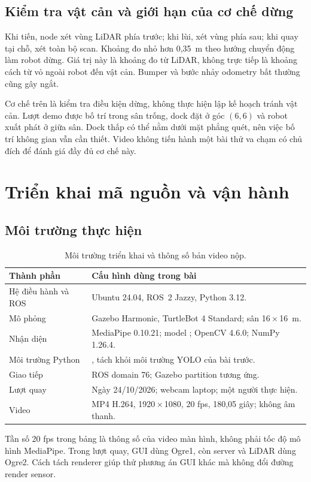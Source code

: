 \documentclass[12pt,a4paper]{article}
\newcommand{\smalltable}{\small\setlength{\tabcolsep}{4pt}\renewcommand{\arraystretch}{1.12}}
\begin{document}
\subsection{Kiểm tra vật cản và giới hạn của cơ chế dừng}
Khi tiến, node xét vùng LiDAR phía trước; khi lùi, xét vùng phía sau; khi quay tại chỗ, xét toàn bộ scan. Khoảng đo nhỏ hơn 0,35~m theo hướng chuyển động làm robot dừng. Giá trị này là khoảng đo từ LiDAR, không trực tiếp là khoảng cách từ vỏ ngoài robot đến vật cản. Bumper và bước nhảy odometry bất thường cũng gây ngắt.

Cơ chế trên là kiểm tra điều kiện dừng, không thực hiện lập kế hoạch tránh vật cản. Lượt demo được bố trí trong sân trống, dock đặt ở góc $(6,6)$ và robot xuất phát ở giữa sân. Dock thấp có thể nằm dưới mặt phẳng quét, nên việc bố trí không gian vẫn cần thiết. Video không tiến hành một bài thử va chạm có chủ đích để đánh giá đầy đủ cơ chế này.

\section{Triển khai mã nguồn và vận hành}
\subsection{Môi trường thực hiện}
\begin{table}[!htbp]\centering\smalltable
\begin{tabularx}{\linewidth}{@{}p{4.1cm}L@{}}\toprule
\textbf{Thành phần} & \textbf{Cấu hình dùng trong bài}\\\midrule
Hệ điều hành và ROS & Ubuntu 24.04, ROS~2 Jazzy, Python 3.12.\\
Mô phỏng & Gazebo Harmonic, TurtleBot 4 Standard; sân 16\,$\times$\,16~m.\\
Nhận diện & MediaPipe 0.10.21; model ; OpenCV 4.6.0; NumPy 1.26.4.\\
Môi trường Python & , tách khỏi môi trường YOLO của bài trước.\\
Giao tiếp & ROS domain 76; Gazebo partition tương ứng.\\
Lượt quay & Ngày 24/10/2026; webcam laptop; một người thực hiện.\\
Video & MP4 H.264, 1920\,$\times$\,1080, 20 fps, 180,05 giây; không âm thanh.\\\bottomrule
\end{tabularx}
\caption{Môi trường triển khai và thông số bản video nộp.}
\end{table}
Tần số 20 fps trong bảng là thông số của video màn hình, không phải tốc độ mô hình MediaPipe. Trong lượt quay, GUI dùng Ogre1, còn server và LiDAR dùng Ogre2. Cách tách renderer giúp thử phương án GUI khác mà không đổi đường render sensor.
\end{document}
